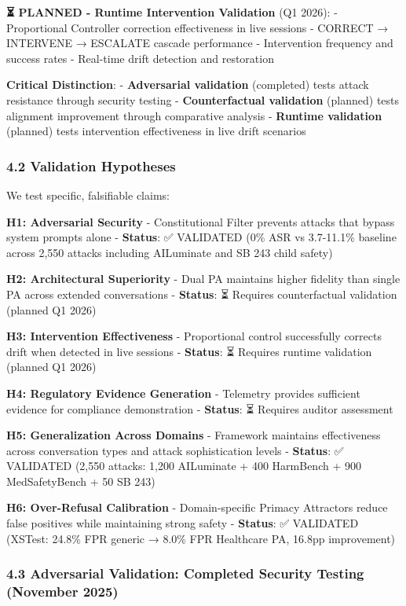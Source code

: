 \textbf{⏳ PLANNED - Runtime Intervention Validation} (Q1 2026): -
Proportional Controller correction effectiveness in live sessions -
CORRECT → INTERVENE → ESCALATE cascade performance - Intervention
frequency and success rates - Real-time drift detection and restoration

\textbf{Critical Distinction}: - \textbf{Adversarial validation}
(completed) tests attack resistance through security testing -
\textbf{Counterfactual validation} (planned) tests alignment improvement
through comparative analysis - \textbf{Runtime validation} (planned)
tests intervention effectiveness in live drift scenarios

\subsubsection{4.2 Validation Hypotheses}\label{validation-hypotheses}

We test specific, falsifiable claims:

\textbf{H1: Adversarial Security} - Constitutional Filter prevents
attacks that bypass system prompts alone - \textbf{Status}: ✅ VALIDATED
(0\% ASR vs 3.7-11.1\% baseline across 2,550 attacks including
AILuminate and SB 243 child safety)

\textbf{H2: Architectural Superiority} - Dual PA maintains higher
fidelity than single PA across extended conversations - \textbf{Status}:
⏳ Requires counterfactual validation (planned Q1 2026)

\textbf{H3: Intervention Effectiveness} - Proportional control
successfully corrects drift when detected in live sessions -
\textbf{Status}: ⏳ Requires runtime validation (planned Q1 2026)

\textbf{H4: Regulatory Evidence Generation} - Telemetry provides
sufficient evidence for compliance demonstration - \textbf{Status}: ⏳
Requires auditor assessment

\textbf{H5: Generalization Across Domains} - Framework maintains
effectiveness across conversation types and attack sophistication levels
- \textbf{Status}: ✅ VALIDATED (2,550 attacks: 1,200 AILuminate + 400
HarmBench + 900 MedSafetyBench + 50 SB 243)

\textbf{H6: Over-Refusal Calibration} - Domain-specific Primacy
Attractors reduce false positives while maintaining strong safety -
\textbf{Status}: ✅ VALIDATED (XSTest: 24.8\% FPR generic → 8.0\% FPR
Healthcare PA, 16.8pp improvement)

\subsubsection{4.3 Adversarial Validation: Completed Security Testing
(November
2025)}\label{adversarial-validation-completed-security-testing-november-2025}

